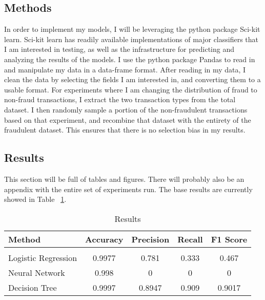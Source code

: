 \documentclass[midd]{thesis}
\begin{document}
\pagebreak


\subsection{Methods}

In order to implement my models, I will be leveraging the python package Sci-kit learn. Sci-kit learn has readily available implementations of major classifiers that I am interested in testing, as well as the infrastructure for predicting and analyzing the results of the models. I use the python package Pandas to read in and manipulate my data in a data-frame format. After reading in my data, I clean the data by selecting the fields I am interested in, and converting them to a usable format. For experiments where I am changing the distribution of fraud to non-fraud transactions, I extract the two transaction types from the total dataset. I then randomly sample a portion of the non-fraudulent transactions based on that experiment, and recombine that dataset with the entirety of the fraudulent dataset. This ensures that there is no selection bias in my results. 

\subsection{Results}

This section will be full of tables and figures. There will probably also be an appendix with the entire set of experiments run. The base results are currently showed in Table ~\ref{sec:results}.

\begin{table}[htbp]\centering
\def\sym#1{\ifmmode^{#1}\else\(^{#1}\)\fi}
\caption{Results \label{tab1}}
\label{sec:results}
\scalebox{0.8} {
\begin{tabular}{l c c c c} \hline\hline
\addlinespace
Method&Accuracy& Precision&Recall& F1 Score\\
\hline
\addlinespace
\addlinespace
\multicolumn{5}{l}{\textit{Base Results}}\\
Logistic Regression	            &	0.9977	&	0.781	&	0.333	&	0.467	\\
Neural Network 	                &	0.998		&	0	&	0	&	0	\\
Decision Tree	            &	0.9997		&	0.8947	&	0.909	&	0.9017	\\

\hline\hline
\end{tabular}
}
\end{table} 
\end{document}
